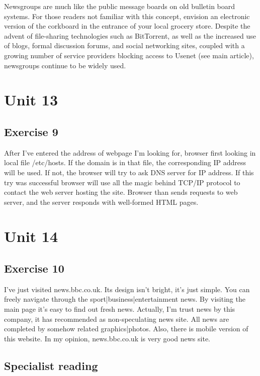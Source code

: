 \documentclass[a5paper,10pt,notitlepage,pdftex,headsepline]{scrartcl}
\begin{document}
    Newsgroups are much like the public message boards on old bulletin board
    systems.
    For those readers not familiar with this concept, envision an electronic
    version of the corkboard in the entrance of your local grocery store.
    Despite the advent of file-sharing technologies such as BitTorrent, as
    well as the increased use of blogs, formal discussion forums, and social
    networking sites, coupled with a growing number of service providers
    blocking access to Usenet (see main article), newsgroups continue to be
    widely used.
\section{Unit 13}
  \label{sec:unit_13}
  \subsection{Exercise 9}
    After I've entered the address of webpage I'm looking for, browser first
    looking in local file /etc/hosts.
    If the domain is in that file, the corresponding IP address will be used.
    If not, the browser will try to ask DNS server for IP address.
    If this try was successful browser will use all the magic behind TCP/IP
    protocol to contact the web server hosting the site.
    Browser than sends requests to web server, and the server responds with
    well-formed HTML pages.
\section{Unit 14}
  \subsection{Exercise 10}
    I've just visited news.bbc.co.uk.
    Its design isn't bright, it's just simple.
    You can freely navigate through the sport|business|entertainment news.
    By visiting the main page it's easy to find out fresh news.
    Actually, I'm trust news by this company, it has recommended as
    non-speculating news site.
    All news are completed by somehow related graphics|photos.
    Also, there is mobile version of this website.
    In my opinion, news.bbc.co.uk is very good news site.
  \subsection{Specialist reading}
\end{document}
